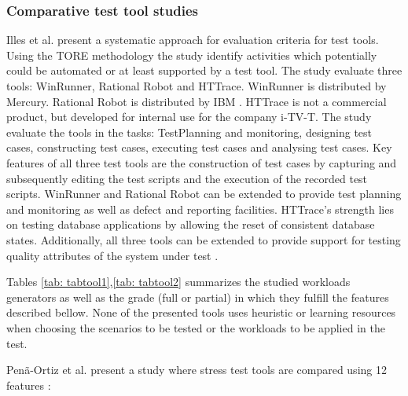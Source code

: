 \documentclass{report}
\begin{document}
\subsubsection{Comparative test tool studies}

Illes et al. present a systematic approach for evaluation criteria for test tools. Using the TORE methodology the study identify activities which potentially could be automated or at least supported by a test tool. The study evaluate three tools: WinRunner, Rational Robot  and HTTrace. WinRunner is distributed by Mercury.  Rational Robot is distributed by IBM . HTTrace is not a commercial product, but developed for internal use for the company i-TV-T. The study evaluate the tools in the tasks: TestPlanning and monitoring, designing test cases, constructing test cases, executing test cases and analysing test cases. Key features of all three test tools are the construction of test cases by
capturing and subsequently editing the test scripts and the execution of the recorded test
scripts.  WinRunner and Rational Robot can be extended to provide test planning and monitoring as well as defect and reporting facilities. HTTrace’s strength lies on testing database applications by allowing the reset of consistent database states. Additionally, all three tools can be extended to provide support for testing quality attributes of the system under test \cite{Illes2005}.

Tables \ref{tab: tabtool1},\ref{tab: tabtool2} summarizes the studied workloads generators as well as the grade (full or partial) in which they fulfill the features described bellow. None of the presented tools uses heuristic or learning resources when choosing the scenarios to be tested or the workloads to be applied in the test.

Penã-Ortiz et al. present a study where stress test tools are compared using 12 features \cite{MohammadS.Obaidat}:
\end{document}
